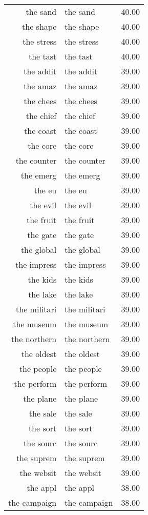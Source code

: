 \begin{table}[ht]
\begin{tabular}{rlr}
  the sand & the sand & 40.00 \\ 
  the shape & the shape & 40.00 \\ 
  the stress & the stress & 40.00 \\ 
  the tast & the tast & 40.00 \\ 
  the addit & the addit & 39.00 \\ 
  the amaz & the amaz & 39.00 \\ 
  the chees & the chees & 39.00 \\ 
  the chief & the chief & 39.00 \\ 
  the coast & the coast & 39.00 \\ 
  the core & the core & 39.00 \\ 
  the counter & the counter & 39.00 \\ 
  the emerg & the emerg & 39.00 \\ 
  the eu & the eu & 39.00 \\ 
  the evil & the evil & 39.00 \\ 
  the fruit & the fruit & 39.00 \\ 
  the gate & the gate & 39.00 \\ 
  the global & the global & 39.00 \\ 
  the impress & the impress & 39.00 \\ 
  the kids & the kids & 39.00 \\ 
  the lake & the lake & 39.00 \\ 
  the militari & the militari & 39.00 \\ 
  the museum & the museum & 39.00 \\ 
  the northern & the northern & 39.00 \\ 
  the oldest & the oldest & 39.00 \\ 
  the people & the people & 39.00 \\ 
  the perform & the perform & 39.00 \\ 
  the plane & the plane & 39.00 \\ 
  the sale & the sale & 39.00 \\ 
  the sort & the sort & 39.00 \\ 
  the sourc & the sourc & 39.00 \\ 
  the suprem & the suprem & 39.00 \\ 
  the websit & the websit & 39.00 \\ 
  the appl & the appl & 38.00 \\ 
  the campaign & the campaign & 38.00 \\ 

\end{tabular}
\end{table}
